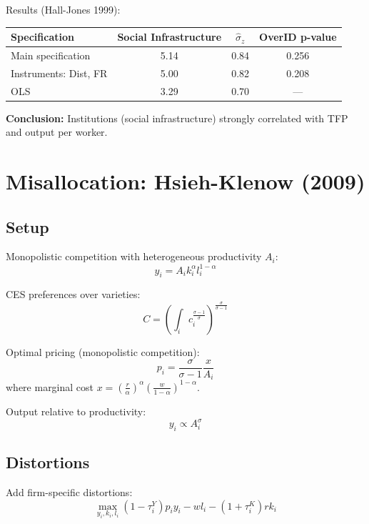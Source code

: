 \documentclass[a4paper,11pt]{article}
\begin{document}
Results (Hall-Jones 1999):
\begin{center}
\begin{tabular}{lccc}
\toprule
Specification & Social Infrastructure & $\hat{\sigma}_z$ & OverID p-value \\
\midrule
Main specification & 5.14 & 0.84 & 0.256 \\
Instruments: Dist, FR & 5.00 & 0.82 & 0.208 \\
OLS & 3.29 & 0.70 & — \\
\bottomrule
\end{tabular}
\end{center}

\begin{resultbox}
\textbf{Conclusion:} Institutions (social infrastructure) strongly correlated with TFP and output per worker.
\end{resultbox}

\section{Misallocation: Hsieh-Klenow (2009)}

\subsection*{Setup}

Monopolistic competition with heterogeneous productivity $A_i$:
\[
y_i = A_i k_i^\alpha l_i^{1-\alpha}
\tag{HK-Production}
\]

CES preferences over varieties:
\[
C = \left(\int_i c_i^{\frac{\sigma-1}{\sigma}}\right)^{\frac{\sigma}{\sigma-1}}
\tag{CES-Preferences}
\]

Optimal pricing (monopolistic competition):
\[
p_i = \frac{\sigma}{\sigma-1} \frac{x}{A_i}
\tag{Pricing}
\]
where marginal cost $x = \left(\frac{r}{\alpha}\right)^\alpha \left(\frac{w}{1-\alpha}\right)^{1-\alpha}$.

Output relative to productivity:
\[
y_i \propto A_i^{\sigma}
\tag{HK-Output}
\]

\subsection*{Distortions}

Add firm-specific distortions:
\[
\max_{y_i,k_i,l_i} (1-\tau_i^Y)p_i y_i - wl_i - (1+\tau_i^K)rk_i
\tag{Distorted-Problem}
\]
\end{document}
